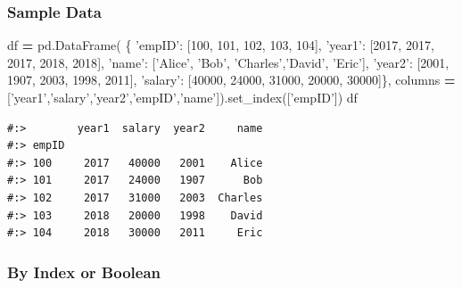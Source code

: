 \documentclass[
]{book}
\newenvironment{Shaded}{\begin{snugshade}}{\end{snugshade}}
\newcommand{\DecValTok}[1]{\textcolor[rgb]{0.06,0.06,0.06}{#1}}
\newcommand{\NormalTok}[1]{#1}
\newcommand{\OperatorTok}[1]{\textcolor[rgb]{0.43,0.43,0.43}{\textbf{#1}}}
\newcommand{\StringTok}[1]{\textcolor[rgb]{0.5,0.5,0.5}{#1}}
\begin{document}
\hypertarget{sample-data-8}{%
\subsubsection{Sample Data}\label{sample-data-8}}

\begin{Shaded}
\begin{Highlighting}[]
\NormalTok{df }\OperatorTok{=}\NormalTok{ pd.DataFrame(}
\NormalTok{    \{ }\StringTok{'empID'}\NormalTok{:  [}\DecValTok{100}\NormalTok{,      }\DecValTok{101}\NormalTok{,    }\DecValTok{102}\NormalTok{,      }\DecValTok{103}\NormalTok{,     }\DecValTok{104}\NormalTok{],}
      \StringTok{'year1'}\NormalTok{:   [}\DecValTok{2017}\NormalTok{,     }\DecValTok{2017}\NormalTok{,   }\DecValTok{2017}\NormalTok{,      }\DecValTok{2018}\NormalTok{,    }\DecValTok{2018}\NormalTok{],}
      \StringTok{'name'}\NormalTok{:   [}\StringTok{'Alice'}\NormalTok{,  }\StringTok{'Bob'}\NormalTok{,  }\StringTok{'Charles'}\NormalTok{,}\StringTok{'David'}\NormalTok{, }\StringTok{'Eric'}\NormalTok{],}
      \StringTok{'year2'}\NormalTok{:   [}\DecValTok{2001}\NormalTok{,     }\DecValTok{1907}\NormalTok{,   }\DecValTok{2003}\NormalTok{,      }\DecValTok{1998}\NormalTok{,    }\DecValTok{2011}\NormalTok{],}
      \StringTok{'salary'}\NormalTok{: [}\DecValTok{40000}\NormalTok{,    }\DecValTok{24000}\NormalTok{,  }\DecValTok{31000}\NormalTok{,     }\DecValTok{20000}\NormalTok{,   }\DecValTok{30000}\NormalTok{]\},}
\NormalTok{    columns }\OperatorTok{=}\NormalTok{ [}\StringTok{'year1'}\NormalTok{,}\StringTok{'salary'}\NormalTok{,}\StringTok{'year2'}\NormalTok{,}\StringTok{'empID'}\NormalTok{,}\StringTok{'name'}\NormalTok{]).set_index([}\StringTok{'empID'}\NormalTok{])}
\NormalTok{df}
\end{Highlighting}
\end{Shaded}

\begin{verbatim}
#:>        year1  salary  year2     name
#:> empID                               
#:> 100     2017   40000   2001    Alice
#:> 101     2017   24000   1907      Bob
#:> 102     2017   31000   2003  Charles
#:> 103     2018   20000   1998    David
#:> 104     2018   30000   2011     Eric
\end{verbatim}

\hypertarget{by-index-or-boolean}{%
\subsubsection{By Index or Boolean}\label{by-index-or-boolean}}
\end{document}
